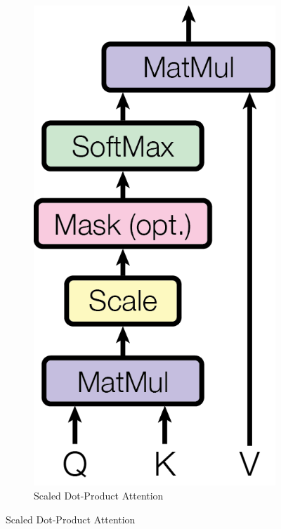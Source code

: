 \begin{figure}
     \centering
     \begin{subfigure}[b]{0.3\textwidth}
         \centering
         \includegraphics[width=\textwidth]{graphic/scaled-dot.png}
         \caption{Scaled Dot-Product Attention}

\end{subfigure}
\end{figure}
